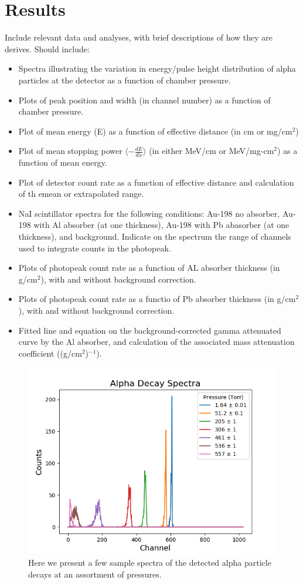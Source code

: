 \documentclass[10pt,aps,prb,twocolumn, nofootinbib]{revtex4-1}
\begin{document}
\section{Results}
Include relevant data and analyses, with brief descriptions of how they are derives.  Should include: 
\begin{itemize}
	\item Spectra illustrating the variation in energy/pulse height distribution of alpha particles at the detector as a function of chamber pressure.
	\item Plots of peak position and width (in channel number) as a function of chamber pressure.
	\item Plot of mean energy (E) as a function of effective distance (in cm or mg/cm$^{2}$)
	\item Plot of mean stopping power $\langle -\frac{dE}{dx} \rangle$ (in either MeV/cm or MeV/mg-cm$^{2}$) as a function of mean energy.
	\item Plot of detector count rate as a function of effective distance and calculation of th emean or extrapolated range.
	\item NaI scintillator spectra for the following conditions: Au-198 no absorber, Au-198 with Al absorber (at one thickness), Au-198 with Pb abasorber (at one thickness), and background.  Indicate on the spectrum the range of channels used to integrate counts in the photopeak.
	\item Plots of photopeak count rate as a function of AL absorber thickness (in g/cm$^2$), with and without background correction.
	\item Plots of photopeak count rate as a functio of Pb absorber thickness (in g/cm$^{2}$), with and without background correction.
	\item Fitted line and equation on the background-corrected gamma attenuated curve by the Al absorber, and calculation of the associated mass attenuation coefficient ((g/cm$^{2}$)$^{-1}$).
\end{itemize}

\begin{figure}[h!]
	\includegraphics[width=.5\textwidth,keepaspectratio]{spectra_samples.png}
	\caption{Here we present a few sample spectra of the detected alpha particle decays at an assortment of pressures. \label{alph_spec}}
\end{figure} 
\end{document}
